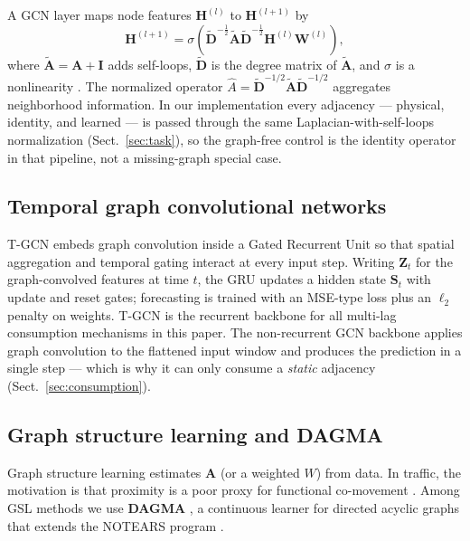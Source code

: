 A GCN layer maps node features $\mathbf{H}^{(l)}$ to
$\mathbf{H}^{(l+1)}$ by
\begin{equation}\label{eq:gcn-layer}
\mathbf{H}^{(l+1)}
=\sigma\!\left(
\tilde{\mathbf{D}}^{-\frac12}\tilde{\mathbf{A}}
\tilde{\mathbf{D}}^{-\frac12}
\mathbf{H}^{(l)}\mathbf{W}^{(l)}
\right),
\end{equation}
where $\tilde{\mathbf{A}}=\mathbf{A}+\mathbf{I}$ adds self-loops,
$\tilde{\mathbf{D}}$ is the degree matrix of $\tilde{\mathbf{A}}$, and
$\sigma$ is a nonlinearity \citep{kipf2017semi}. The normalized operator
$\hat{A}=\tilde{\mathbf{D}}^{-1/2}\tilde{\mathbf{A}}
\tilde{\mathbf{D}}^{-1/2}$ aggregates neighborhood information. In our
implementation every adjacency --- physical, identity, and learned --- is
passed through the same Laplacian-with-self-loops normalization
(Sect.~\ref{sec:task}), so the graph-free control is the identity operator
in that pipeline, not a missing-graph special case.

\subsection{Temporal graph convolutional networks}\label{sec:bg-tgcn}

T-GCN \citep{zhao2019t} embeds graph convolution inside a Gated Recurrent
Unit so that spatial aggregation and temporal gating interact at every
input step. Writing $\mathbf{Z}_t$ for the graph-convolved features at time
$t$, the GRU updates a hidden state $\mathbf{S}_t$ with update and reset
gates; forecasting is trained with an MSE-type loss plus an $\ell_2$
penalty on weights. T-GCN is the recurrent backbone for all multi-lag
consumption mechanisms in this paper. The non-recurrent GCN backbone applies
graph convolution to the flattened input window and produces the prediction
in a single step --- which is why it can only consume a \emph{static}
adjacency (Sect.~\ref{sec:consumption}).

\subsection{Graph structure learning and DAGMA}\label{sec:bg-dagma}

Graph structure learning estimates $\mathbf{A}$ (or a weighted $W$) from
data. In traffic, the motivation is that proximity is a poor proxy for
functional co-movement \citep{Chen2022}. Among GSL methods we use
\textbf{DAGMA} \citep{Bello2024DAGMA}, a continuous learner for directed
acyclic graphs that extends the NOTEARS program
\citep{zheng2018dags}.

